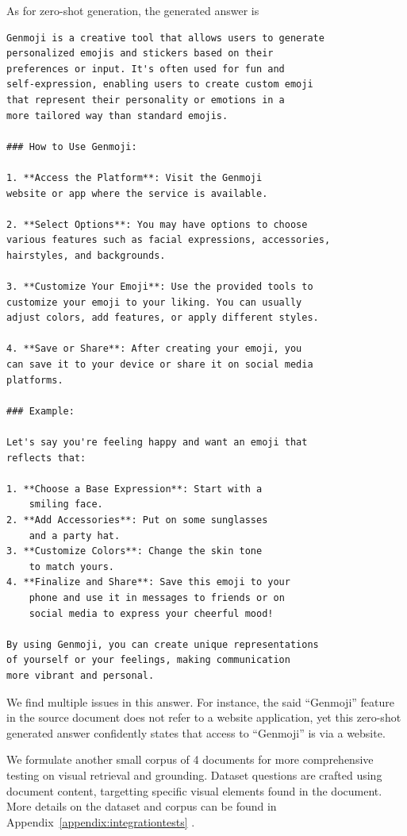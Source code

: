 As for zero-shot generation, the generated answer is
\begin{verbatim}
Genmoji is a creative tool that allows users to generate 
personalized emojis and stickers based on their 
preferences or input. It's often used for fun and 
self-expression, enabling users to create custom emoji 
that represent their personality or emotions in a 
more tailored way than standard emojis.

### How to Use Genmoji:

1. **Access the Platform**: Visit the Genmoji 
website or app where the service is available.
   
2. **Select Options**: You may have options to choose 
various features such as facial expressions, accessories, 
hairstyles, and backgrounds.

3. **Customize Your Emoji**: Use the provided tools to 
customize your emoji to your liking. You can usually 
adjust colors, add features, or apply different styles.

4. **Save or Share**: After creating your emoji, you 
can save it to your device or share it on social media 
platforms.

### Example:

Let's say you're feeling happy and want an emoji that 
reflects that:

1. **Choose a Base Expression**: Start with a 
    smiling face.
2. **Add Accessories**: Put on some sunglasses 
    and a party hat.
3. **Customize Colors**: Change the skin tone 
    to match yours.
4. **Finalize and Share**: Save this emoji to your 
    phone and use it in messages to friends or on 
    social media to express your cheerful mood!

By using Genmoji, you can create unique representations 
of yourself or your feelings, making communication 
more vibrant and personal.
\end{verbatim}
We find multiple issues in this answer.
For instance, the said ``Genmoji'' feature in the source document does not refer to a website application,
yet this zero-shot generated answer confidently states that access to ``Genmoji'' is via a website.

We formulate another small corpus of 4 documents for more comprehensive testing on visual retrieval and grounding.
Dataset questions are crafted using document content, targetting specific visual elements found in the document.
More details on the dataset and corpus can be found in Appendix~\ref{appendix:integrationtests} .

